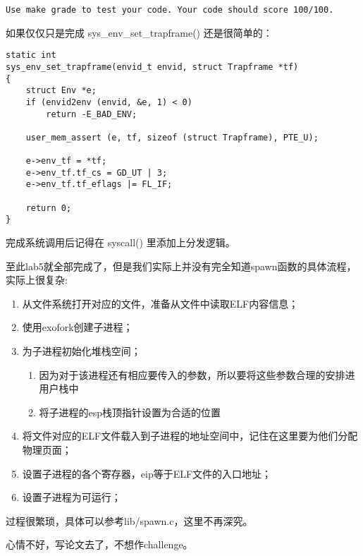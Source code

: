 \documentclass{article}
\newcommand{\funcname}[1]{{\ttfamily \small #1}}
\begin{document}
\begin{CJK*}{UTF8}{gkai}
\begin{lstlisting}[style=exercise]
Use make grade to test your code. Your code should score 100/100.
\end{lstlisting}

如果仅仅只是完成 \funcname{sys\_env\_set\_trapframe() }还是很简单的：

\begin{lstlisting}[style=ccode, title={\scriptsize \ttfamily \bfseries kern/: ()}]
static int
sys_env_set_trapframe(envid_t envid, struct Trapframe *tf)
{
    struct Env *e;
    if (envid2env (envid, &e, 1) < 0)
        return -E_BAD_ENV;

    user_mem_assert (e, tf, sizeof (struct Trapframe), PTE_U);

    e->env_tf = *tf;
    e->env_tf.tf_cs = GD_UT | 3;
    e->env_tf.tf_eflags |= FL_IF;
    
    return 0;
}
\end{lstlisting}

完成系统调用后记得在 \funcname{syscall()} 里添加上分发逻辑。

至此lab5就全部完成了，但是我们实际上并没有完全知道spawn函数的具体流程，实际上很复杂:

\begin{enumerate}
\item{从文件系统打开对应的文件，准备从文件中读取ELF内容信息；}
\item{使用exofork创建子进程；}
\item{为子进程初始化堆栈空间；
\begin{enumerate}
    \item{因为对于该进程还有相应要传入的参数，所以要将这些参数合理的安排进用户栈中}
    \item{将子进程的esp栈顶指针设置为合适的位置}
\end{enumerate}
}
\item{将文件对应的ELF文件载入到子进程的地址空间中，记住在这里要为他们分配物理页面；}
\item{设置子进程的各个寄存器，eip等于ELF文件的入口地址；}
\item{设置子进程为可运行；}
\end{enumerate}

过程很繁琐，具体可以参考lib/spawn.c，这里不再深究。


心情不好，写论文去了，不想作challenge。

\clearpage

\end{CJK*}
\end{document}
